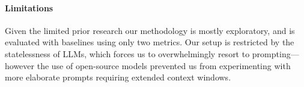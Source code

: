 %
\paragraph{Limitations} 
Given the limited prior research our methodology is mostly exploratory, and is evaluated with baselines using only two metrics. Our setup is restricted by the statelessness of LLMs, which forces us to overwhelmingly resort to prompting---however the use of open-source models prevented us from experimenting with more elaborate prompts requiring extended context windows.

